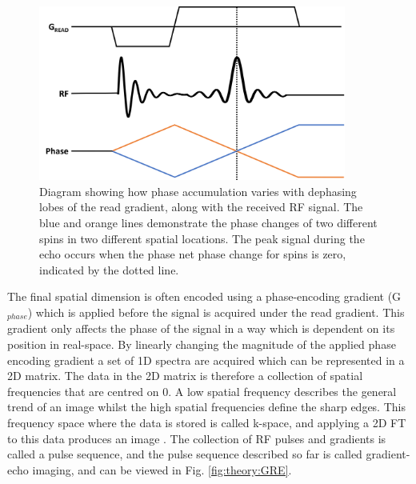 \begin{figure}
    \centering
    \includegraphics[width=0.9\textwidth]{Figures/Theory/RePhasing.png}
    \caption{Diagram showing how phase accumulation varies with dephasing lobes of the read gradient, along with the received \ac{RF} signal. The blue and orange lines demonstrate the phase changes of two different spins in two different spatial locations. The peak signal during the echo occurs when the phase net phase change for spins is zero, indicated by the dotted line.}
    \label{fig:enter-label}
\end{figure}

The final spatial dimension is often encoded using a phase-encoding gradient (G$_{phase}$) which is applied before the signal is acquired under the read gradient. This gradient only affects the phase of the signal in a way which is dependent on its position in real-space. By linearly changing the magnitude of the applied phase encoding gradient a set of 1D spectra are acquired which can be represented in a 2D matrix. The data in the 2D matrix is therefore a collection of spatial frequencies that are centred on 0. A low spatial frequency describes the general trend of an image whilst the high spatial frequencies define the sharp edges. This frequency space where the data is stored is called k-space, and applying a 2D \ac{FT} to this data produces an image \cite{Lauterbur1973ImageResonance, Mansfield1977Multi-planarEchoes}. The collection of \ac{RF} pulses and gradients is called a pulse sequence, and the pulse sequence described so far is called gradient-echo imaging, and can be viewed in Fig. \ref{fig:theory:GRE}.

